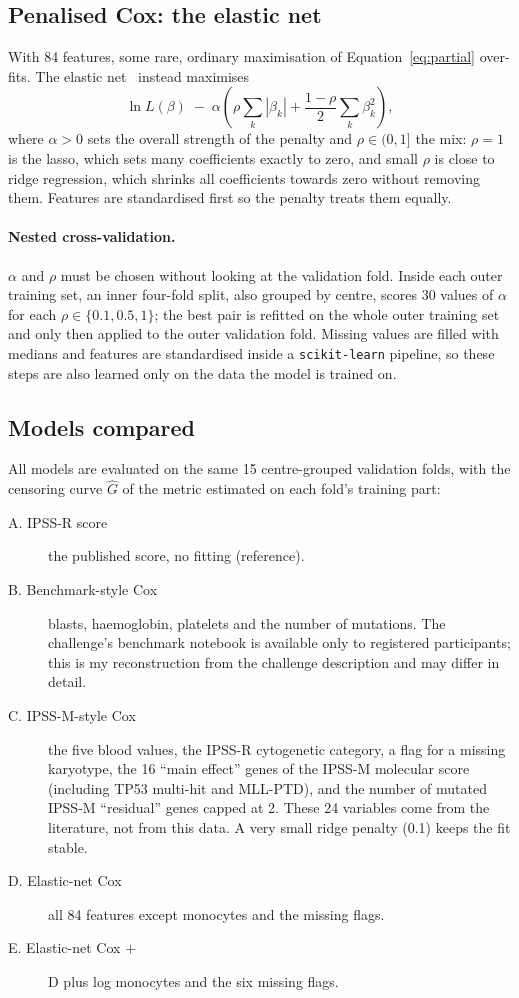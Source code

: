 \documentclass[11pt,a4paper]{article}
\begin{document}
\subsection{Penalised Cox: the elastic net}
With 84 features, some rare, ordinary maximisation of Equation~\eqref{eq:partial}
over-fits. The elastic net~\cite{zou2005,simon2011} instead maximises
\begin{equation}
\ln L(\beta) \;-\; \alpha\left(\rho \sum_k |\beta_k| + \frac{1-\rho}{2}\sum_k \beta_k^2\right),
\label{eq:enet}
\end{equation}
where $\alpha > 0$ sets the overall strength of the penalty and $\rho \in (0, 1]$ the mix:
$\rho = 1$ is the lasso, which sets many coefficients exactly to zero, and small $\rho$ is
close to ridge regression, which shrinks all coefficients towards zero without removing
them. Features are standardised first so the penalty treats them equally.

\paragraph{Nested cross-validation.} $\alpha$ and $\rho$ must be chosen without looking at
the validation fold. Inside each outer training set, an inner four-fold split, also
grouped by centre, scores 30 values of $\alpha$ for each $\rho \in \{0.1, 0.5, 1\}$; the
best pair is refitted on the whole outer training set and only then applied to the outer
validation fold. Missing values are filled with medians and features are standardised
inside a \texttt{scikit-learn} pipeline, so these steps are also learned only on the data
the model is trained on.

\subsection{Models compared}
All models are evaluated on the same 15 centre-grouped validation folds, with the
censoring curve $\hat G$ of the metric estimated on each fold's training part:
\begin{description}
  \item[A. IPSS-R score] the published score, no fitting (reference).
  \item[B. Benchmark-style Cox] blasts, haemoglobin, platelets and the number of mutations.
        The challenge's benchmark notebook is available only to registered participants;
        this is my reconstruction from the challenge description and may differ in detail.
  \item[C. IPSS-M-style Cox] the five blood values, the IPSS-R cytogenetic category, a
        flag for a missing karyotype, the 16 ``main effect'' genes of the IPSS-M
        molecular score~\cite{bernard2022} (including TP53 multi-hit and MLL-PTD), and
        the number of mutated IPSS-M ``residual'' genes capped at 2. These 24 variables
        come from the literature, not from this data. A very small ridge penalty (0.1)
        keeps the fit stable.
  \item[D. Elastic-net Cox] all 84 features except monocytes and the missing flags.
  \item[E. Elastic-net Cox $+$] D plus log monocytes and the six missing flags.
\end{description}
\end{document}
